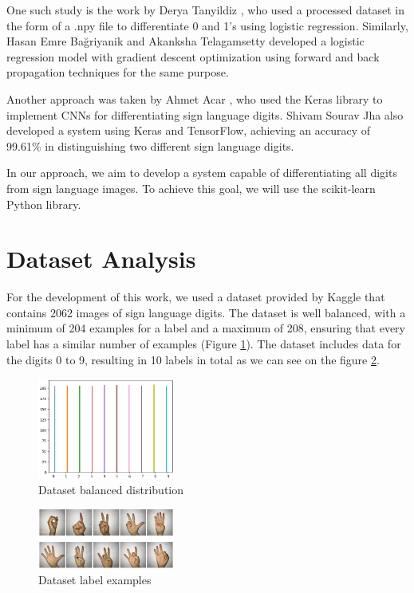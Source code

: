 \documentclass[conference]{IEEEtran}
\begin{document}
One such study is the work by Derya Tanyildiz \cite{tanyildiz}, who used a processed dataset in the form of a .npy file to differentiate 0 and 1's using logistic regression. Similarly, Hasan Emre Bağriyanik \cite{bagriyanik} and Akanksha Telagamsetty \cite{telagamsetty} developed a logistic regression model with gradient descent optimization using forward and back propagation techniques for the same purpose.

Another approach was taken by Ahmet Acar \cite{acar}, who used the Keras library to implement CNNs for differentiating sign language digits. Shivam Sourav Jha \cite{jha} also developed a system using Keras and TensorFlow, achieving an accuracy of 99.61\% in distinguishing two different sign language digits.

In our approach, we aim to develop a system capable of differentiating all digits from sign language images. To achieve this goal, we will use the scikit-learn Python library.
\section{Dataset Analysis}
For the development of this work, we used a dataset provided by Kaggle that contains 2062 images of sign language digits. The dataset is well balanced, with a minimum of 204 examples for a label and a maximum of 208, ensuring that every label has a similar number of examples (Figure \ref{fig:dataset-balanced}). The dataset includes data for the digits 0 to 9, resulting in 10 labels in total as we can see on the figure \ref{fig:dataset-examples}. 

\begin{figure}[h]
    \centering
    \includegraphics[width=0.4\textwidth]{assets/dataset-labels.png}
    \caption{Dataset balanced distribution}
    \label{fig:dataset-balanced}
\end{figure}


\begin{figure}[h]
    \centering
    \includegraphics[width=0.4\textwidth]{assets/sign-language-digits.png}
    \caption{Dataset label examples}
    \label{fig:dataset-examples}
\end{figure}
\end{document}
